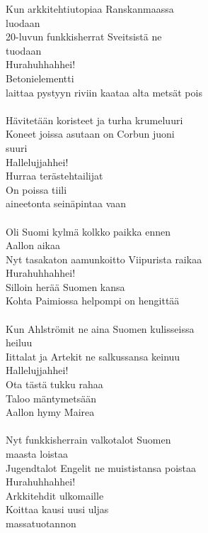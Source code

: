 
Kun arkkitehtiutopiaa Ranskanmaassa \\ luodaan \\ 20-luvun funkkisherrat Sveitsistä ne \\ tuodaan \\ Hurahuhhahhei! \\ Betonielementti \\ laittaa pystyyn riviin kaataa alta metsät pois \\ \hspace{10mm} \\ Hävitetään koristeet ja turha krumeluuri \\ Koneet joissa asutaan on Corbun juoni \\ suuri \\ Hallelujjahhei! \\ Hurraa terästehtailijat \\ On poissa tiili \\ aineetonta seinäpintaa vaan \\ \hspace{10mm} \\ Oli Suomi kylmä kolkko paikka ennen \\ Aallon aikaa \\ Nyt tasakaton aamunkoitto Viipurista raikaa \\ Hurahuhhahhei! \\ Silloin herää Suomen kansa \\ Kohta Paimiossa helpompi on hengittää \\ \hspace{10mm} \\ Kun Ahlströmit ne aina Suomen kulisseissa \\ heiluu \\ Iittalat ja Artekit ne salkussansa keinuu \\ Hallelujjahhei! \\ Ota tästä tukku rahaa \\ Taloo mäntymetsään \\ Aallon hymy Mairea \\ \hspace{10mm} \\ Nyt funkkisherrain valkotalot Suomen \\ maasta loistaa \\ Jugendtalot Engelit ne muististansa poistaa \\ Hurahuhhahhei! \\ Arkkitehdit ulkomaille \\ Koittaa kausi uusi uljas \\ massatuotannon